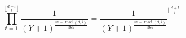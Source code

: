 \documentclass{minimal}
\begin{document}
  \begin{equation*}
\prod_{t=1}^{\lfloor{\frac{d+l}{l}}\rfloor}\frac{1}{(Y+1)^{\frac{m-\operatorname{mod}\left(d,l\right)}{365}}} = \frac{1}{\left(Y+1\right)^{\frac{m-\operatorname{mod}\left(d,l\right)}{365}}}^{\lfloor{\frac{d+l}{l}}\rfloor}
  \end{equation*}
\end{document}
